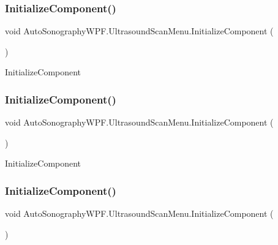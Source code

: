 \subsubsection{\texorpdfstring{Initialize\+Component()}{InitializeComponent()}\hspace{0.1cm}{\footnotesize\ttfamily [1/4]}}
{\footnotesize\ttfamily void Auto\+Sonography\+W\+P\+F.\+Ultrasound\+Scan\+Menu.\+Initialize\+Component (\begin{DoxyParamCaption}{ }\end{DoxyParamCaption})}



Initialize\+Component 

\hypertarget{class_auto_sonography_w_p_f_1_1_ultrasound_scan_menu_a16a3c05a908d3edf244d0e5ec887519b}{}\label{class_auto_sonography_w_p_f_1_1_ultrasound_scan_menu_a16a3c05a908d3edf244d0e5ec887519b} 
\subsubsection{\texorpdfstring{Initialize\+Component()}{InitializeComponent()}\hspace{0.1cm}{\footnotesize\ttfamily [2/4]}}
{\footnotesize\ttfamily void Auto\+Sonography\+W\+P\+F.\+Ultrasound\+Scan\+Menu.\+Initialize\+Component (\begin{DoxyParamCaption}{ }\end{DoxyParamCaption})}



Initialize\+Component 

\hypertarget{class_auto_sonography_w_p_f_1_1_ultrasound_scan_menu_a16a3c05a908d3edf244d0e5ec887519b}{}\label{class_auto_sonography_w_p_f_1_1_ultrasound_scan_menu_a16a3c05a908d3edf244d0e5ec887519b} 
\subsubsection{\texorpdfstring{Initialize\+Component()}{InitializeComponent()}\hspace{0.1cm}{\footnotesize\ttfamily [3/4]}}
{\footnotesize\ttfamily void Auto\+Sonography\+W\+P\+F.\+Ultrasound\+Scan\+Menu.\+Initialize\+Component (\begin{DoxyParamCaption}{ }\end{DoxyParamCaption})}



